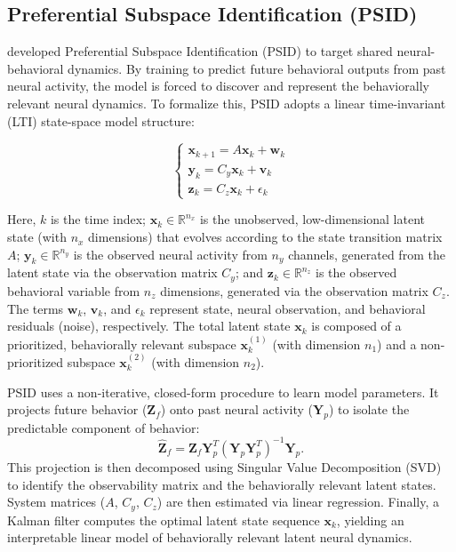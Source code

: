 \documentclass[12pt, letterpaper]{article}
\begin{document}
\subsection{Preferential Subspace Identification (PSID)}

\textcite{saniModelingBehaviorallyRelevant2021} developed Preferential Subspace Identification (PSID) to target shared neural-behavioral dynamics. By training to predict future behavioral outputs from past neural activity, the model is forced to discover and represent the behaviorally relevant neural dynamics. To formalize this, PSID adopts a linear time-invariant (LTI) state-space model structure:

$$
\begin{cases}
\mathbf{x}_{k+1} = A \mathbf{x}_k + \mathbf{w}_k \\
\mathbf{y}_k = C_y \mathbf{x}_k + \mathbf{v}_k \\
\mathbf{z}_k = C_z \mathbf{x}_k + \epsilon_k
\end{cases}
$$

Here, $k$ is the time index; $\mathbf{x}_k \in \mathbb{R}^{n_x}$ is the unobserved, low-dimensional latent state (with $n_x$ dimensions) that evolves according to the state transition matrix $A$; $\mathbf{y}_k \in \mathbb{R}^{n_y}$ is the observed neural activity from $n_y$ channels, generated from the latent state via the observation matrix $C_y$; and $\mathbf{z}_k \in \mathbb{R}^{n_z}$ is the observed behavioral variable from $n_z$ dimensions, generated via the observation matrix $C_z$. The terms $\mathbf{w}_k$, $\mathbf{v}_k$, and $\epsilon_k$ represent state, neural observation, and behavioral residuals (noise), respectively. The total latent state $\mathbf{x}_k$ is composed of a prioritized, behaviorally relevant subspace $\mathbf{x}_k^{(1)}$ (with dimension $n_1$) and a non-prioritized subspace $\mathbf{x}_k^{(2)}$ (with dimension $n_2$).

PSID uses a non-iterative, closed-form procedure to learn model parameters. It projects future behavior ($\mathbf{Z}_f$) onto past neural activity ($\mathbf{Y}_p$) to isolate the predictable component of behavior:
$$\hat{\mathbf{Z}}_f = \mathbf{Z}_f \mathbf{Y}_p^T (\mathbf{Y}_p \mathbf{Y}_p^T)^{-1} \mathbf{Y}_p.$$
This projection is then decomposed using Singular Value Decomposition (SVD) to identify the observability matrix and the behaviorally relevant latent states. System matrices ($A$, $C_y$, $C_z$) are then estimated via linear regression. Finally, a Kalman filter computes the optimal latent state sequence $\mathbf{x}_k$, yielding an interpretable linear model of behaviorally relevant latent neural dynamics.
\end{document}
